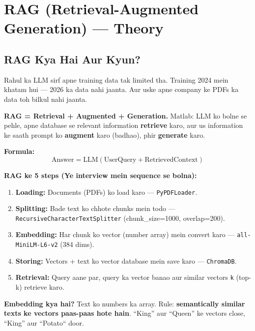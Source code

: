 \documentclass[11pt, a4paper]{article}
\begin{document}
\newpage

\section{RAG (Retrieval-Augmented Generation) --- Theory}

\subsection{RAG Kya Hai Aur Kyun?}

\begin{storybox}
Rahul ka LLM sirf apne training data tak limited tha. Training 2024 mein khatam hui --- 2026 ka data nahi jaanta. Aur uske apne company ke PDFs ka data toh bilkul nahi jaanta.

\textbf{RAG = Retrieval + Augmented + Generation.} Matlab: LLM ko bolne se pehle, apne database se relevant information \textbf{retrieve} karo, aur us information ke saath prompt ko \textbf{augment} karo (badhao), phir \textbf{generate} karo.

\textbf{Formula:}
\[
\text{Answer} = \text{LLM}(\text{UserQuery} + \text{RetrievedContext})
\]
\end{storybox}

\begin{conceptbox}
\textbf{RAG ke 5 steps (Ye interview mein sequence se bolna):}

\begin{enumerate}[label=\textcolor{accentpurple}{\arabic*.}]
\item \textbf{Loading:} Documents (PDFs) ko load karo --- \texttt{PyPDFLoader}.
\item \textbf{Splitting:} Bade text ko chhote chunks mein todo --- \texttt{RecursiveCharacterTextSplitter} (chunk\_size=1000, overlap=200).
\item \textbf{Embedding:} Har chunk ko vector (number array) mein convert karo --- \texttt{all-MiniLM-L6-v2} (384 dims).
\item \textbf{Storing:} Vectors + text ko vector database mein save karo --- \texttt{ChromaDB}.
\item \textbf{Retrieval:} Query aane par, query ka vector banao aur similar vectors \texttt{k} (top-k) retrieve karo.
\end{enumerate}

\textbf{Embedding kya hai?} Text ko numbers ka array. Rule: \textbf{semantically similar texts ke vectors paas-paas hote hain}. ``King'' aur ``Queen'' ke vectors close, ``King'' aur ``Potato`` door.
\end{conceptbox}
\end{document}
